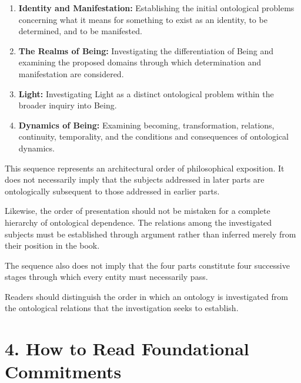 \begin{enumerate}

    \item \textbf{Identity and Manifestation:}
    Establishing the initial ontological problems
    concerning what it means for something to
    exist as an identity, to be determined,
    and to be manifested.

    \item \textbf{The Realms of Being:}
    Investigating the differentiation of Being
    and examining the proposed domains through
    which determination and manifestation are
    considered.

    \item \textbf{Light:}
    Investigating Light as a distinct ontological
    problem within the broader inquiry into Being.

    \item \textbf{Dynamics of Being:}
    Examining becoming, transformation, relations,
    continuity, temporality, and the conditions
    and consequences of ontological dynamics.

\end{enumerate}

This sequence represents an architectural
order of philosophical exposition. It does
not necessarily imply that the subjects
addressed in later parts are ontologically
subsequent to those addressed in earlier
parts.

Likewise, the order of presentation should
not be mistaken for a complete hierarchy
of ontological dependence. The relations
among the investigated subjects must be
established through argument rather than
inferred merely from their position in
the book.

The sequence also does not imply that
the four parts constitute four successive
stages through which every entity must
necessarily pass.

Readers should distinguish the order
in which an ontology is investigated
from the ontological relations that the
investigation seeks to establish.


\section*{4. How to Read Foundational Commitments}

